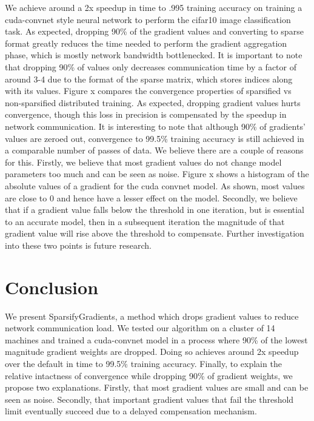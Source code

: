 \documentclass[10pt]{article}
\begin{document}
We achieve around a 2x speedup in time to .995 training accuracy on
training a cuda-convnet style neural network to perform the cifar10
image classification task. As expected, dropping 90\% of the gradient
values and converting to sparse format greatly reduces the time needed
to perform the gradient aggregation phase, which is mostly network
bandwidth bottlenecked. It is important to note that dropping 90\% of
values only decreases communication time by a factor of around 3-4 due
to the format of the sparse matrix, which stores indices along with
its values. Figure x compares the convergence properties of sparsified
vs non-sparsified distributed training. As expected, dropping gradient
values hurts convergence, though this loss in precision is compensated
by the speedup in network communication. It is interesting to note
that although 90\% of gradients' values are zeroed out, convergence to
99.5\% training accuracy is still achieved in a comparable number of
passes of data. We believe there are a couple of reasons for
this. Firstly, we believe that most gradient values do not change
model parameters too much and can be seen as noise. Figure x shows a
histogram of the absolute values of a gradient for the cuda convnet
model. As shown, most values are close to 0 and hence have a lesser
effect on the model. Secondly, we believe that if a gradient value
falls below the threshold in one iteration, but is essential to an accurate
model, then in a subsequent iteration the magnitude of that gradient
value will rise above the threshold to compensate. Further
investigation into these two points is future research.

\section{Conclusion}
\label{sec-6}

We present SparsifyGradients, a method which drops gradient values to
reduce network communication load. We tested our algorithm on a
cluster of 14 machines and trained a cuda-convnet model in a process
where 90\% of the lowest magnitude gradient weights are dropped. Doing
so achieves around 2x speedup over the default in time to 99.5\%
training accuracy. Finally, to explain the relative intactness of
convergence while dropping 90\% of gradient weights, we propose two
explanations. Firstly, that most gradient values are small and can be
seen as noise. Secondly, that important gradient values that fail the
threshold limit eventually succeed due to a delayed compensation mechanism.
\end{document}
